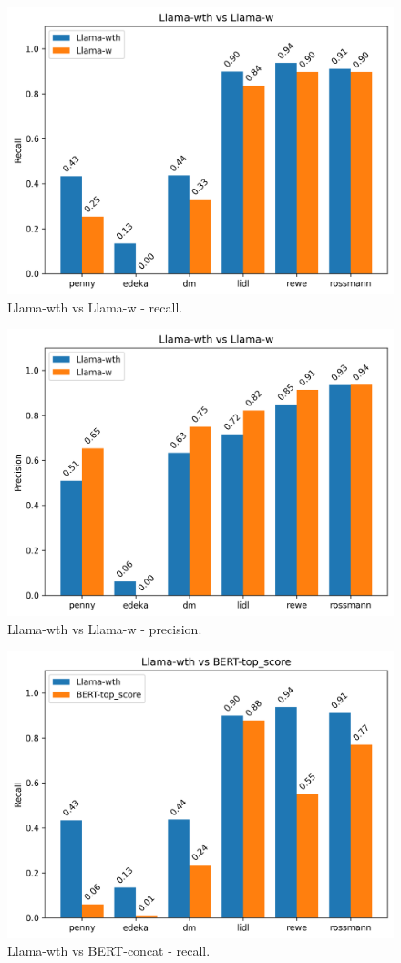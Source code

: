 \documentclass[licencjacka,en]{pracamgr}
\begin{document}
\begin{figure}[htbp]
    \centering
    \includegraphics[width=0.8\linewidth]{bachelor_images/benchmark/llama_wth_vs_w_recall.png}
    \caption{Llama-wth vs Llama-w - recall.}
    \label{fig:llama_wth_vs_w_recall}
\end{figure}

\begin{figure}[htbp]
    \centering
    \includegraphics[width=0.8\linewidth]{bachelor_images/benchmark/llama_wth_vs_w_precision.png}
    \caption{Llama-wth vs Llama-w - precision.}
    \label{fig:llama_wth_vs_w_precision}
\end{figure}

\begin{figure}[htbp]
    \centering
    \includegraphics[width=0.8\linewidth]{bachelor_images/benchmark/llama_vs_bert_recall.png}
    \caption{Llama-wth vs BERT-concat - recall.}
    \label{fig:llama_vs_bert_recall}
\end{figure}
\end{document}
